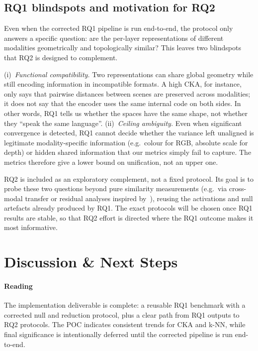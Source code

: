 \documentclass[10pt,conference,compsocconf]{IEEEtran}
\begin{document}
\subsection{RQ1 blindspots and motivation for RQ2}\label{sec:rq2-motivation}
Even when the corrected RQ1 pipeline is run end-to-end, the protocol
only answers a specific question: are the per-layer representations of
different modalities geometrically and topologically similar? This
leaves two blindspots that RQ2 is designed to complement.

(i)~\emph{Functional compatibility.} Two representations can share
global geometry while still encoding information in incompatible
formats. A high CKA, for instance, only says that pairwise distances
between scenes are preserved across modalities; it does not say that
the encoder uses the same internal code on both sides. In other words,
RQ1 tells us whether the spaces have the same shape, not whether they
``speak the same language''. (ii)~\emph{Ceiling ambiguity.} Even when
significant convergence is detected, RQ1 cannot decide whether the
variance left unaligned is legitimate modality-specific information
(e.g.\ colour for RGB, absolute scale for depth) or hidden shared
information that our metrics simply fail to capture. The metrics
therefore give a lower bound on unification, not an upper one.

RQ2 is included as an exploratory complement, not a fixed protocol.
Its goal is to probe these two questions beyond pure similarity
measurements (e.g.\ via cross-modal transfer or residual analyses
inspired by~\cite{4m,4m21}), reusing the activations and null
artefacts already produced by RQ1. The exact protocols will be chosen
once RQ1 results are stable, so that RQ2 effort is directed where the
RQ1 outcome makes it most informative.

\section{Discussion \& Next Steps}\label{sec:next}

\paragraph{Reading}
The implementation deliverable is complete: a reusable RQ1 benchmark
with a corrected null and reduction protocol, plus a clear path from
RQ1 outputs to RQ2 protocols. The POC indicates consistent trends for
CKA and k-NN, while final significance is intentionally deferred until
the corrected pipeline is run end-to-end.
\end{document}
